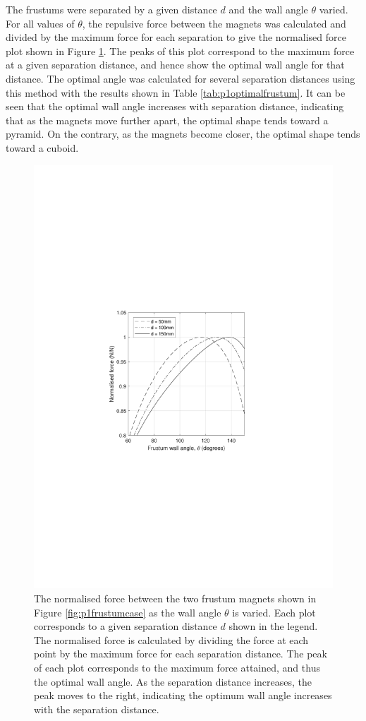 The frustums were separated by a given distance \(d\) and the wall angle \(\theta\) varied. For all values of \(\theta\), the repulsive force between the magnets was calculated and divided by the maximum force for each separation to give the normalised force plot shown in Figure \ref{fig:p1frustumforce}. The peaks of this plot correspond to the maximum force at a given separation distance, and hence show the optimal wall angle for that distance. The optimal angle was calculated for several separation distances using this method with the results shown in Table \ref{tab:p1optimalfrustum}. It can be seen that the optimal wall angle increases with separation distance, indicating that as the magnets move further apart, the optimal shape tends toward a pyramid. On the contrary, as the magnets become closer, the optimal shape tends toward a cuboid.
\begin{figure}
	\centering
	\includegraphics[trim = 5cm 9cm 5cm 9cm,width=0.8\linewidth]{p1/p1FIG8}
	\caption{The normalised force between the two frustum magnets shown in Figure \ref{fig:p1frustumcase} as the wall angle \(\theta\) is varied. Each plot corresponds to a given separation distance \(d\) shown in the legend. The normalised force is calculated by dividing the force at each point by the maximum force for each separation distance. The peak of each plot corresponds to the maximum force attained, and thus the optimal wall angle. As the separation distance increases, the peak moves to the right, indicating the optimum wall angle increases with the separation distance.}
	\label{fig:p1frustumforce}
\end{figure}
